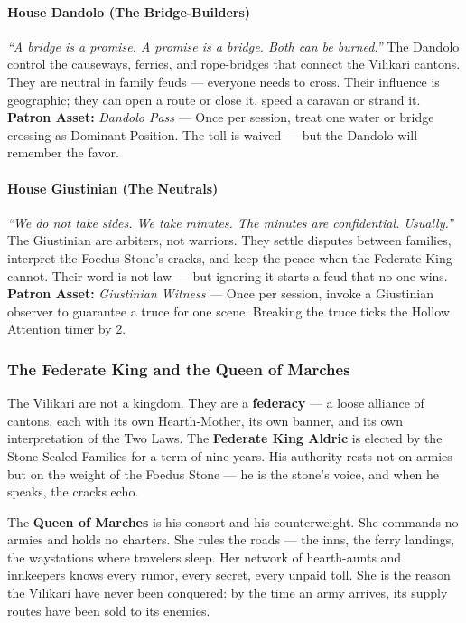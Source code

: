 \paragraph{House Dandolo (The Bridge-Builders)}
\textit{``A bridge is a promise. A promise is a bridge. Both can be burned.''}
The Dandolo control the causeways, ferries, and rope-bridges that connect the Vilikari cantons. They are neutral in family feuds --- everyone needs to cross. Their influence is geographic; they can open a route or close it, speed a caravan or strand it.
\textbf{Patron Asset:} \textit{Dandolo Pass} --- Once per session, treat one water or bridge crossing as Dominant Position. The toll is waived --- but the Dandolo will remember the favor.

\paragraph{House Giustinian (The Neutrals)}
\textit{``We do not take sides. We take minutes. The minutes are confidential. Usually.''}
The Giustinian are arbiters, not warriors. They settle disputes between families, interpret the Foedus Stone's cracks, and keep the peace when the Federate King cannot. Their word is not law --- but ignoring it starts a feud that no one wins.
\textbf{Patron Asset:} \textit{Giustinian Witness} --- Once per session, invoke a Giustinian observer to guarantee a truce for one scene. Breaking the truce ticks the Hollow Attention timer by 2.

\subsubsection*{The Federate King and the Queen of Marches}

The Vilikari are not a kingdom. They are a \textbf{federacy} --- a loose alliance of cantons, each with its own Hearth-Mother, its own banner, and its own interpretation of the Two Laws. The \textbf{Federate King Aldric} is elected by the Stone-Sealed Families for a term of nine years. His authority rests not on armies but on the weight of the Foedus Stone --- he is the stone's voice, and when he speaks, the cracks echo.

The \textbf{Queen of Marches} is his consort and his counterweight. She commands no armies and holds no charters. She rules the roads --- the inns, the ferry landings, the waystations where travelers sleep. Her network of hearth-aunts and innkeepers knows every rumor, every secret, every unpaid toll. She is the reason the Vilikari have never been conquered: by the time an army arrives, its supply routes have been sold to its enemies.

